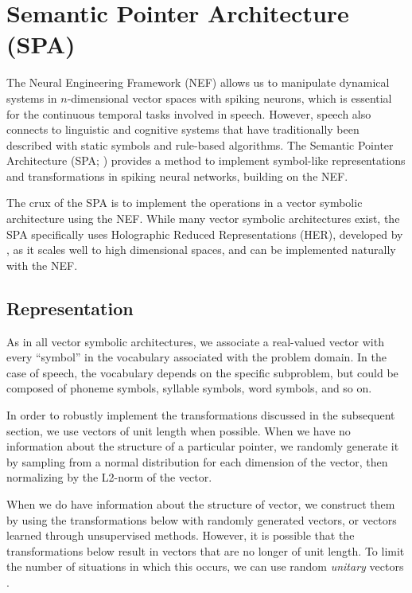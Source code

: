 {{\section{Semantic Pointer Architecture (SPA)}
\label{sec:methods-spa}

The Neural Engineering Framework (NEF)
allows us to manipulate dynamical systems
in $n$-dimensional vector spaces
with spiking neurons,
which is essential for
the continuous temporal tasks
involved in speech.
However, speech also connects
to linguistic and cognitive systems
that have traditionally been described
with static symbols
and rule-based algorithms.
The Semantic Pointer Architecture (SPA; \cite{eliasmith2013})
provides a method to implement
symbol-like representations
and transformations in spiking neural networks,
building on the NEF.

The crux of the SPA is to implement
the operations in
a vector symbolic architecture
using the NEF.
While many vector symbolic architectures exist,
the SPA specifically uses
Holographic Reduced Representations (HER),
developed by \cite{plate1994},
as it scales well to high dimensional spaces,
and can be implemented naturally
with the NEF.

\subsection{Representation}

As in all vector symbolic architectures,
we associate a real-valued vector
with every ``symbol''
in the vocabulary associated with
the problem domain.
In the case of speech,
the vocabulary depends on
the specific subproblem,
but could be composed
of phoneme symbols,
syllable symbols,
word symbols, and so on.

In order to robustly implement
the transformations discussed
in the subsequent section,
we use vectors of unit length
when possible.
When we have no information
about the structure of a particular pointer,
we randomly generate it
by sampling from a normal distribution
for each dimension of the vector,
then normalizing by the L2-norm
of the vector.


When we do have information about
the structure of vector,
we construct them by
using the transformations below
with randomly generated vectors,
or vectors learned through
unsupervised methods.
However, it is possible that
the transformations below
result in vectors that are
no longer of unit length.
To limit the number of situations
in which this occurs,
we can use random \textit{unitary} vectors
\cite{plate1994}.

}}
